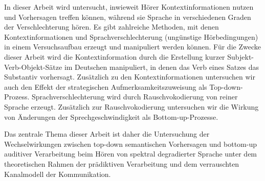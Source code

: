 \documentclass[a4paper, nobind]{templates/ociamthesis}
\begin{document}
\begin{romanpages}
\begin{abstractsecond}
In dieser Arbeit wird untersucht, inwieweit Hörer Kontextinformationen nutzen und Vorhersagen treffen können, während sie Sprache in verschiedenen Graden der Verschlechterung hören.
Es gibt zahlreiche Methoden, mit denen Kontextinformationen und Sprachverschlechterung (ungünstige Hörbedingungen) in einem Versuchsaufbau erzeugt und manipuliert werden können.
Für die Zwecke dieser Arbeit wird die Kontextinformation durch die Erstellung kurzer Subjekt-Verb-Objekt-Sätze im Deutschen manipuliert, in denen das Verb eines Satzes das Substantiv vorhersagt.
Zusätzlich zu den Kontextinformationen untersuchen wir auch den Effekt der strategischen Aufmerksamkeitszuweisung als Top-down-Prozess.
Sprachverschlechterung wird durch Rauschvokodierung von reiner Sprache erzeugt.
Zusätzlich zur Rauschvokodierung untersuchen wir die Wirkung von Änderungen der Sprechgeschwindigkeit als Bottom-up-Prozesse.

Das zentrale Thema dieser Arbeit ist daher die Untersuchung der Wechselwirkungen zwischen top-down semantischen Vorhersagen und bottom-up auditiver Verarbeitung beim Hören von spektral degradierter Sprache unter dem theoretischen Rahmen der prädiktiven Verarbeitung und dem verrauschten Kanalmodell der Kommunikation.


\end{abstractsecond}
\end{romanpages}
\end{document}
